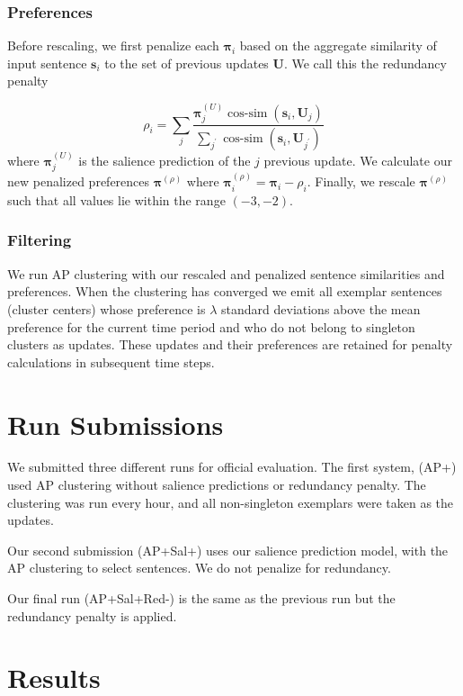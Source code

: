 \documentclass{sig-alternate}
\begin{document}
\subsubsection{Preferences}

Before rescaling, we first penalize each $\boldsymbol{\pi}_i$ based on
the aggregate similarity of input sentence $\mathbf{s}_i$ to the set of previous updates
$\mathbf{U}$. We call this the redundancy penalty 

$$\rho_i = \sum_j \frac{\boldsymbol{\pi}^{(U)}_{j}\operatorname{cos-sim}(\mathbf{s}_i, \mathbf{U}_j)}
{\sum_{j^\prime}\operatorname{cos-sim}(\mathbf{s}_i, \mathbf{U}_{j^\prime})} $$   
where $\boldsymbol{\pi}^{(U)}_{j}$ is the salience prediction of the $j$ 
previous update. We calculate our new penalized preferences 
$\boldsymbol{\pi}^{(\rho)}$ where $\boldsymbol{\pi}^{(\rho)}_i = \boldsymbol{\pi}_i - \rho_i$.
Finally, we rescale $\boldsymbol{\pi}^{(\rho)}$ such that all values lie 
within the range $(-3,-2)$.

\subsubsection{Filtering}

We run AP clustering with our rescaled and penalized sentence similarities
and preferences. When the clustering has converged we emit all exemplar
sentences (cluster centers) whose preference is $\lambda$ standard deviations
above the mean preference for the current time period and who do not belong
to singleton clusters as updates. These updates and their preferences are 
retained for penalty calculations in subsequent time steps.


\section{Run Submissions}

We submitted three different runs for official evaluation. The first system,
(AP+) used AP clustering without salience predictions or redundancy penalty.
The clustering was run every hour, and all non-singleton exemplars were 
taken as the updates.

Our second submission (AP+Sal+) uses our salience prediction model, with the
AP clustering to select sentences. We do not penalize for redundancy.

Our final run (AP+Sal+Red-) is the same as the previous run but the 
redundancy penalty is applied.

\section{Results}
\end{document}
